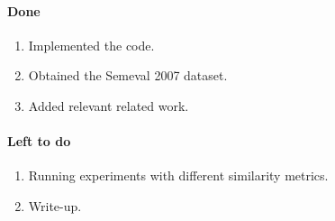 \documentclass[11pt,letterpaper]{article}
\begin{document}
\paragraph{Done}
\begin{enumerate}
\item Implemented the code.
\item Obtained the Semeval 2007 dataset.
\item Added relevant related work.
\end{enumerate}
\paragraph{Left to do}
\begin{enumerate}
\item Running experiments with different similarity metrics.
\item Write-up.
\end{enumerate}


  
\end{document}
